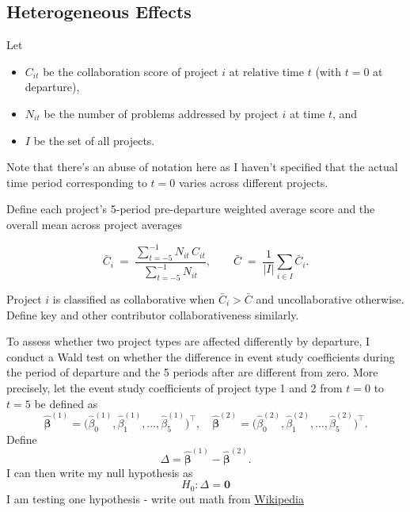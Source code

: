 \documentclass[12pt,notitlepage]{article}
\begin{document}
\subsection{Heterogeneous Effects}


Let
\begin{itemize}
  \item $C_{it}$ be the collaboration score of project $i$ at relative time $t$ (with $t=0$ at departure),
  \item $N_{it}$ be the number of problems addressed by project $i$ at time $t$, and
  \item $I$ be the set of all projects.
\end{itemize}
Note that there's an abuse of notation here as I haven't specified that the actual time period corresponding to $t=0$ varies across different projects. 

Define each project’s 5-period pre-departure weighted average score and the overall mean across project averages

\[
\bar C_i \;=\;
\frac{\displaystyle\sum_{t=-5}^{-1} N_{it}\,C_{it}}
     {\displaystyle\sum_{t=-5}^{-1} N_{it}},
\qquad 
\bar C \;=\;
\frac{1}{\lvert I\rvert}\sum_{i\in I}\bar C_i.
\]

Project $i$ is classified as collaborative when $\bar C_i > \bar C$ and uncollaborative otherwise. Define key and other contributor collaborativeness similarly. 


To assess whether two project types are affected differently by departure, I conduct a Wald test on whether the difference in event study coefficients during the period of departure and the 5 periods after are different from zero. More precisely, let the event study coefficients of project type 1 and 2 from $t=0$ to $t=5$ be defined as
\[
\hat{\boldsymbol\beta}^{(1)} = \bigl(\hat\beta^{(1)}_{0}, \hat\beta^{(1)}_{1}, \dots, \hat\beta^{(1)}_{5}\bigr)^\top,
\quad
\hat{\boldsymbol\beta}^{(2)} = \bigl(\hat\beta^{(2)}_{0}, \hat\beta^{(2)}_{1}, \dots, \hat\beta^{(2)}_{5}\bigr)^\top.
\]
Define
\[
\Delta = \hat{\boldsymbol\beta}^{(1)} - \hat{\boldsymbol\beta}^{(2)}.
\]
I can then write my null hypothesis as \[
H_0: \Delta = \mathbf{0}
\]
I am testing one hypothesis - write out math from \href{https://en.wikipedia.org/wiki/Wald_test#Test(s)_on_multiple_parameters}{Wikipedia}
\end{document}
